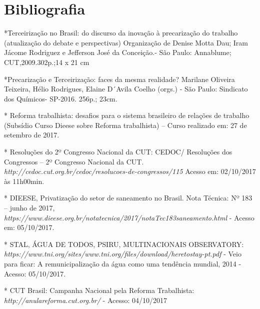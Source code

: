 \section{Bibliografia}

*Terceirização no Brasil: do discurso da inovação à precarização do
trabalho (atualização do debate e perspectivas) Organização de Denise
Motta Dau; Iram Jácome Rodriguez e Jefferson José da Conceição.- São
Paulo: Annablume; CUT,2009.302p.;14 x 21 cm

*Precarização e Terceirização: faces da mesma realidade? Marilane
Oliveira Teixeira, Hélio Rodrigues, Elaine D´Avila Coelho (orgs.) - São
Paulo: Sindicato dos Químicos- SP-2016. 256p.; 23cm.

* Reforma trabalhista: desafios para o sistema brasileiro de relações de
trabalho (Subsídio Curso Dieese sobre Reforma trabalhista) -- Curso
realizado em: 27 de setembro de 2017.

* Resoluções do 2º Congresso Nacional da CUT: CEDOC/ Resoluções dos
Congressos -- 2º Congresso Nacional da CUT.
\emph{http://cedoc.cut.org.br/cedoc/resolucoes-de-congressos/115}
Acesso em: 02/10/2017 às 11h00min.

* DIEESE, Privatização do setor de saneamento no Brasil. Nota Técnica:
Nº 183 -- junho de 2017,
\emph{https://www.dieese.org.br/notatecnica/2017/notaTec183saneamento.html}
- Acesso em: 05/10/2017.

* STAL, ÁGUA DE TODOS, PSIRU, MULTINACIONAIS OBSERVATORY:
\emph{https://www.tni.org/sites/www.tni.org/files/download/heretostay-pt.pdf}
- Veio para ficar: A remunicipalização da água como uma tendência
mundial, 2014 - Acesso: 05/10/2017.

* CUT Brasil: Campanha Nacional pela Reforma Trabalhista:
\emph{http://anulareforma.cut.org.br/}
- Acesso: 04/10/2017
